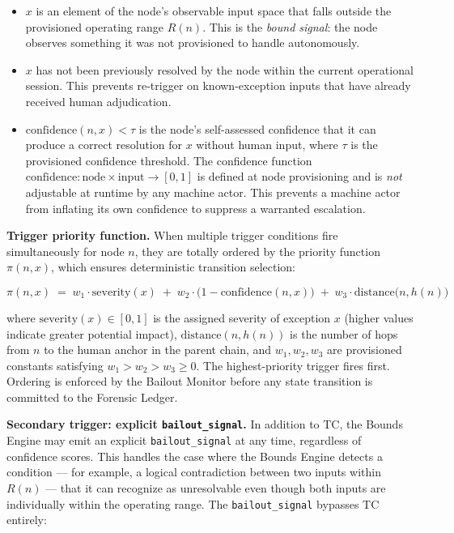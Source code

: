 \begin{itemize}\itemsep=0pt
\item[(i)] $x$ is an element of the node's observable input space that falls outside the provisioned operating range $R(n)$. This is the \emph{bound signal}: the node observes something it was not provisioned to handle autonomously.

\item[(ii)] $x$ has not been previously resolved by the node within the current operational session. This prevents re-trigger on known-exception inputs that have already received human adjudication.

\item[(iii)] $\text{confidence}(n, x) < \tau$ is the node's self-assessed confidence that it can produce a correct resolution for $x$ without human input, where $\tau$ is the provisioned confidence threshold. The confidence function $\text{confidence} : \text{node} \times \text{input} \rightarrow [0, 1]$ is defined at node provisioning and is \emph{not} adjustable at runtime by any machine actor. This prevents a machine actor from inflating its own confidence to suppress a warranted escalation.
\end{itemize}

\bigskip
\noindent\textbf{Trigger priority function.} When multiple trigger conditions fire simultaneously for node $n$, they are totally ordered by the priority function $\pi(n, x)$, which ensures deterministic transition selection:

\begin{equation}
\pi(n, x) \;=\; w_1 \cdot \text{severity}(x) \;+\; w_2 \cdot \bigl(1 - \text{confidence}(n, x)\bigr) \;+\; w_3 \cdot \text{distance}\bigl(n, h(n)\bigr) \tag{PF}
\end{equation}

where $\text{severity}(x) \in [0, 1]$ is the assigned severity of exception $x$ (higher values indicate greater potential impact), $\text{distance}(n, h(n))$ is the number of hops from $n$ to the human anchor in the parent chain, and $w_1, w_2, w_3$ are provisioned constants satisfying $w_1 > w_2 > w_3 \geq 0$. The highest-priority trigger fires first. Ordering is enforced by the Bailout Monitor before any state transition is committed to the Forensic Ledger.

\bigskip
\noindent\textbf{Secondary trigger: explicit \texttt{bailout\_signal}.} In addition to TC, the Bounds Engine may emit an explicit \texttt{bailout\_signal} at any time, regardless of confidence scores. This handles the case where the Bounds Engine detects a condition — for example, a logical contradiction between two inputs within $R(n)$ — that it can recognize as unresolvable even though both inputs are individually within the operating range. The \texttt{bailout\_signal} bypasses TC entirely:

